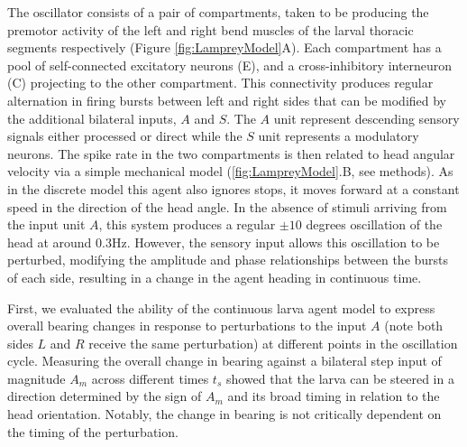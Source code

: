 \documentclass[11pt,a4paper]{article}
\newcommand{\todoBW}[1]{\todo[author=BW,color=orange, size=\tiny,inline]{1}}
\begin{document}
The oscillator consists of a pair of compartments, taken to be producing the premotor activity of the left and right bend muscles of the larval thoracic  segments respectively (Figure \ref{fig:LampreyModel}A). Each compartment has a pool of self-connected excitatory neurons (E), and a cross-inhibitory interneuron (C) projecting to the other compartment. This connectivity produces regular alternation in firing bursts between left and right sides that can be modified by the additional bilateral inputs, $A$ and $S$. The $A$ unit represent descending sensory signals either processed or direct while the $S$ unit represents a modulatory neurons.
 The spike rate in the two compartments is then related to head angular velocity via a simple mechanical model (\ref{fig:LampreyModel}.B, see methods). As in the discrete model this agent also ignores stops, it moves forward at a constant speed in the direction of the head angle. In the absence of stimuli arriving from the input unit $A$, this system produces a regular $\pm 10$ degrees oscillation of the head at around 0.3Hz. However, the sensory input allows this oscillation to be perturbed, modifying  the amplitude and phase relationships between the bursts of each side, resulting in a change in the agent heading in continuous time.



First, we evaluated the ability of the continuous larva agent model to express overall bearing changes in response to perturbations to the input $A$ (note both sides $L$ and $R$ receive the same perturbation) at different points in the oscillation cycle. Measuring the overall change in bearing against a bilateral step input of magnitude $A_m$ across different times $t_s$ showed that the larva can be steered in a direction determined by the sign of $A_m$ and its broad timing in relation to the head orientation.
Notably, the change in bearing is not critically dependent on the timing of the perturbation. 

\end{document}
